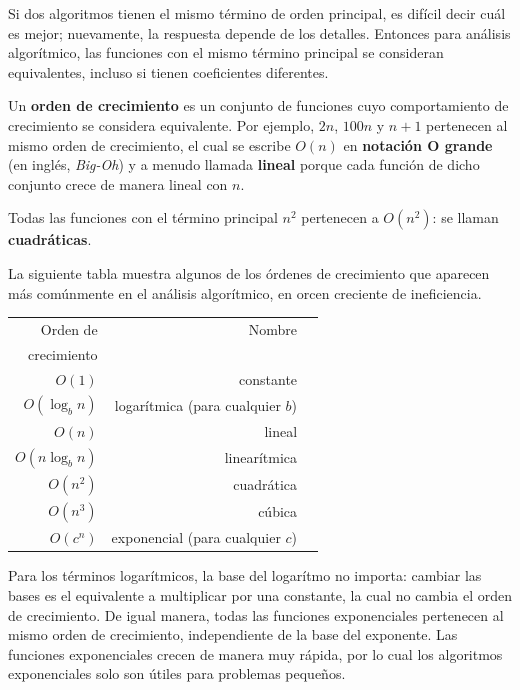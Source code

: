 \documentclass[10pt]{book}
\begin{document}
Si dos algoritmos tienen el mismo término de orden principal, es difícil decir
cuál es mejor; nuevamente, la respuesta depende de los detalles.  Entonces para
análisis algorítmico, las funciones con el mismo término principal
se consideran equivalentes, incluso si tienen coeficientes diferentes.

Un {\bf orden de crecimiento} es un conjunto de funciones cuyo comportamiento
de crecimiento se considera equivalente.  Por ejemplo, $2n$, $100n$ y $n+1$
pertenecen al mismo orden de crecimiento, el cual se escribe $O(n)$ en
{\bf notación O grande} (en inglés, {\em Big-Oh}) y a menudo llamada {\bf lineal} porque cada función
de dicho conjunto crece de manera lineal con $n$.
 

Todas las funciones con el término principal $n^2$ pertenecen a $O(n^2)$: se
llaman {\bf cuadráticas}.

La siguiente tabla muestra algunos de los órdenes de crecimiento que
aparecen más comúnmente en el análisis algorítmico,
en orcen creciente de ineficiencia.

\begin{tabular}{|r|r|r|}
\hline
Orden de     &   Nombre      \\
crecimiento  &               \\
\hline
$O(1)$             & constante \\
$O(\log_b n)$      & logarítmica (para cualquier $b$) \\
$O(n)$             & lineal \\
$O(n \log_b n)$    & linearítmica \\
$O(n^2)$           & cuadrática    \\
$O(n^3)$           & cúbica    \\
$O(c^n)$           & exponencial (para cualquier $c$)    \\
\hline
\end{tabular}

Para los términos logarítmicos, la base del logarítmo no importa:
cambiar las bases es el equivalente a multiplicar por una constante, la cual
no cambia el orden de crecimiento.  De igual manera, todas las
funciones exponenciales pertenecen al mismo orden de crecimiento, independiente de
la base del exponente.
Las funciones exponenciales crecen de manera muy rápida, por lo cual los algoritmos exponenciales
solo son útiles para problemas pequeños.
\end{document}
